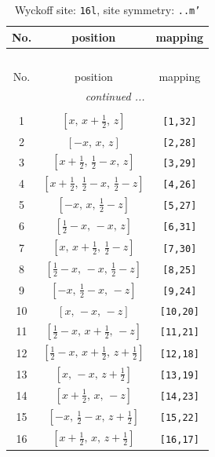 \documentclass[fleqn,8pt]{jsarticle}
\begin{document}
\renewcommand{\arraystretch}{1.2}
\begin{longtable}{ccc}
\caption{Wyckoff site: {\tt 16l}, site symmetry: {\tt ..m'}}
 \\
 \hline \hline
No. & position & mapping \\ \hline \endfirsthead

\multicolumn{2}{l}{\tablename\ \thetable{}} \\
 \hline \hline
No. & position & mapping \\ \hline \endhead

 \hline \hline
\multicolumn{2}{r}{\footnotesize\it continued ...} \\ \endfoot

 \hline \hline
\multicolumn{2}{r}{} \\ \endlastfoot

1 & $\left[ x,\, x + \frac{1}{2},\, z \right]$ & {\tt [1,32]} \\ \hline
2 & $\left[ - x,\, x,\, z \right]$ & {\tt [2,28]} \\ \hline
3 & $\left[ x + \frac{1}{2},\, \frac{1}{2} - x,\, z \right]$ & {\tt [3,29]} \\ \hline
4 & $\left[ x + \frac{1}{2},\, \frac{1}{2} - x,\, \frac{1}{2} - z \right]$ & {\tt [4,26]} \\ \hline
5 & $\left[ - x,\, x,\, \frac{1}{2} - z \right]$ & {\tt [5,27]} \\ \hline
6 & $\left[ \frac{1}{2} - x,\, - x,\, z \right]$ & {\tt [6,31]} \\ \hline
7 & $\left[ x,\, x + \frac{1}{2},\, \frac{1}{2} - z \right]$ & {\tt [7,30]} \\ \hline
8 & $\left[ \frac{1}{2} - x,\, - x,\, \frac{1}{2} - z \right]$ & {\tt [8,25]} \\ \hline
9 & $\left[ - x,\, \frac{1}{2} - x,\, - z \right]$ & {\tt [9,24]} \\ \hline
10 & $\left[ x,\, - x,\, - z \right]$ & {\tt [10,20]} \\ \hline
11 & $\left[ \frac{1}{2} - x,\, x + \frac{1}{2},\, - z \right]$ & {\tt [11,21]} \\ \hline
12 & $\left[ \frac{1}{2} - x,\, x + \frac{1}{2},\, z + \frac{1}{2} \right]$ & {\tt [12,18]} \\ \hline
13 & $\left[ x,\, - x,\, z + \frac{1}{2} \right]$ & {\tt [13,19]} \\ \hline
14 & $\left[ x + \frac{1}{2},\, x,\, - z \right]$ & {\tt [14,23]} \\ \hline
15 & $\left[ - x,\, \frac{1}{2} - x,\, z + \frac{1}{2} \right]$ & {\tt [15,22]} \\ \hline
16 & $\left[ x + \frac{1}{2},\, x,\, z + \frac{1}{2} \right]$ & {\tt [16,17]} \\
\end{longtable}
\end{document}
